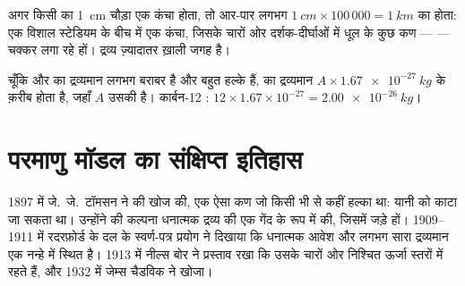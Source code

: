 \begin{example}[स्टेडियम में एक कंचा]\label{ex:g9:inside-the-atom:marble}
अगर किसी  का  \qty{1}{cm} चौड़ा एक कंचा होता, तो 
आर-पार लगभग $\qty{1}{cm} \times 100\,000 = \qty{1}{km}$ का होता: एक विशाल
स्टेडियम के बीच में एक कंचा, जिसके चारों ओर दर्शक-दीर्घाओं में धूल के कुछ
कण ---  --- चक्कर लगा रहे हों। द्रव्य ज़्यादातर ख़ाली
जगह है।
\end{example}

\begin{method}[परमाणु का द्रव्यमान]\label{met:g9:inside-the-atom:mass}
चूँकि  और  का द्रव्यमान लगभग बराबर है और  बहुत हल्के
हैं,  का द्रव्यमान $A \times
\qty{1.67e-27}{kg}$ के क़रीब होता है, जहाँ $A$ उसकी  है। कार्बन-12 :
$12 \times 1.67 \times 10^{-27} = \qty{2.00e-26}{kg}$।
\end{method}

\section{परमाणु मॉडल का संक्षिप्त इतिहास}

\begin{history}[अविभाज्य से नाभिक तक, 1897--1932]
1897 में जे.~जे.~टॉमसन ने  की खोज की, एक ऐसा कण जो किसी भी 
से कहीं हल्का था: यानी  को काटा जा सकता था। उन्होंने  की कल्पना
धनात्मक द्रव्य की एक गेंद के रूप में की, जिसमें  जड़े हों। 1909--1911
में रदरफ़ोर्ड के दल के स्वर्ण-पत्र प्रयोग ने दिखाया कि धनात्मक आवेश और लगभग सारा
द्रव्यमान एक नन्हे  में स्थित है। 1913 में नील्स
बोर ने प्रस्ताव रखा कि  उसके चारों ओर निश्चित ऊर्जा स्तरों में रहते हैं,
और 1932 में जेम्स चैडविक ने  खोजा।
\end{history}

